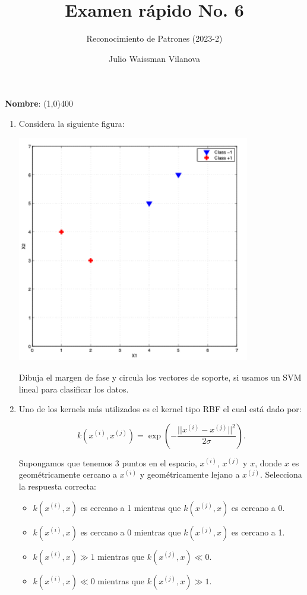 \documentclass[11pt]{article}
\title{Examen rápido No. 6}
\author{Reconocimiento de Patrones (2023-2)}
\date{Julio Waissman Vilanova} %
\begin{document}
\maketitle

\vspace{5mm}

\textbf{Nombre}: \line(1,0){400}

\vspace{9mm}


\begin{enumerate}



\item Considera la siguiente figura:

\begin{center}
  \includegraphics[width = 0.8\textwidth]{svm-1.png}
\end{center}

Dibuja el margen de fase y circula los vectores de soporte, si usamos un SVM lineal para clasificar los datos.


\item Uno de los kernels más utilizados es el kernel tipo RBF el cual está dado por:

$$
k(x^{(i)}, x^{(j)}) = \exp(- \frac{||x^{(i)} - x^{(j)}||^2}{2\sigma}).
$$

Supongamos que tenemos 3 puntos en el espacio, $x^{(i)}$, $x^{(j)}$ y $x$, donde $x$ es geométricamente cercano a $x^{(i)}$ y geométricamente lejano a $x^{(j)}$. Selecciona la respuesta correcta: 

\begin{itemize}
    \item $k(x^{(i)}, x)$ es cercano a 1 mientras que $k(x^{(j)}, x)$ es cercano a 0.
    \item $k(x^{(i)}, x)$ es cercano a 0 mientras que $k(x^{(j)}, x)$ es cercano a 1.
    \item $k(x^{(i)}, x) \gg 1$  mientras que $k(x^{(j)}, x) \ll 0$.
    \item $k(x^{(i)}, x) \ll 0$  mientras que $k(x^{(j)}, x) \gg 1$.
\end{itemize}



\end{enumerate}
\end{document}
